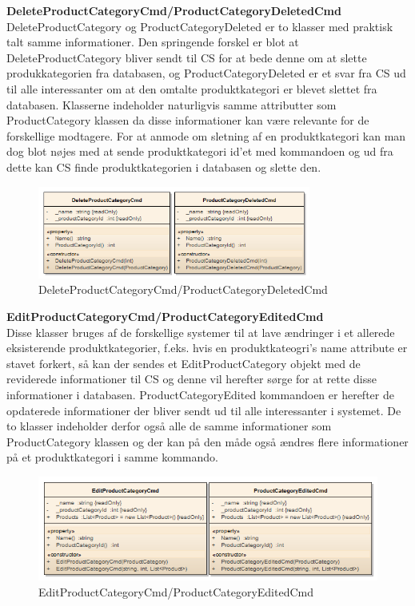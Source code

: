 \textbf{DeleteProductCategoryCmd/ProductCategoryDeletedCmd}\\
DeleteProductCategory og ProductCategoryDeleted er to klasser med praktisk talt samme informationer. Den springende forskel er blot at DeleteProductCategory bliver sendt til \gls{CS} for at bede denne om at slette produkkategorien fra databasen, og ProductCategoryDeleted er et svar fra \gls{CS} ud til alle interessanter om at den omtalte produktkategori er blevet slettet fra databasen.
Klasserne indeholder naturligvis samme attributter som ProductCategory klassen da disse informationer kan være relevante for de forskellige modtagere. For at anmode om sletning af en produktkategori kan man dog blot nøjes med at sende produktkategori id'et med kommandoen og ud fra dette kan \gls{CS} finde produktkategorien i databasen og slette den.


\begin{figure}[H]
    \centering
    \includegraphics[width=0.8\textwidth]{Systemdesign/SharedLib/Images/Klasser/Command/ProductCategory/DeletePrdCtg.png}
    \caption{DeleteProductCategoryCmd/ProductCategoryDeletedCmd}
    \label{fig:klasseCMDDeletePrdCtg}
\end{figure}

\textbf{EditProductCategoryCmd/ProductCategoryEditedCmd}\\
Disse klasser bruges af de forskellige systemer til at lave ændringer i et allerede eksisterende produktkategorier, f.eks. hvis en produktkateogri's name attribute er stavet forkert, så kan der sendes et EditProductCategory objekt med de reviderede informationer til \gls{CS} og denne vil herefter sørge for at rette disse informationer i databasen. ProductCategoryEdited kommandoen er herefter de opdaterede informationer der bliver sendt ud til alle interessanter i systemet. De to klasser indeholder derfor også alle de samme informationer som ProductCategory klassen og der kan på den måde også ændres flere informationer på et produktkategori i samme kommando.


\begin{figure}[H]
    \centering
    \includegraphics[width=1.0\textwidth]{Systemdesign/SharedLib/Images/Klasser/Command/ProductCategory/EditPrdCtg.png}
    \caption{EditProductCategoryCmd/ProductCategoryEditedCmd}
    \label{fig:klasseCMDEditPrdCtg}
\end{figure}


